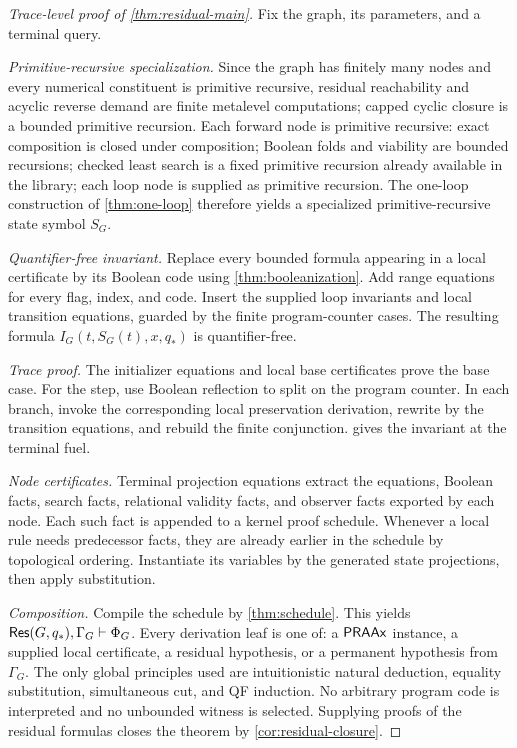 \begin{proof}[Trace-level proof of \cref{thm:residual-main}]
Fix the graph, its parameters, and a terminal query.

\emph{Primitive-recursive specialization.}  Since the graph has finitely many nodes and every numerical constituent is primitive recursive, residual reachability and acyclic reverse demand are finite metalevel computations; capped cyclic closure is a bounded primitive recursion.  Each forward node is primitive recursive: exact composition is closed under composition; Boolean folds and viability are bounded recursions; checked least search is a fixed primitive recursion already available in the library; each loop node is supplied as primitive recursion.  The one-loop construction of \cref{thm:one-loop} therefore yields a specialized primitive-recursive state symbol \(S_G\).

\emph{Quantifier-free invariant.}  Replace every bounded formula appearing in a local certificate by its Boolean code using \cref{thm:booleanization}.  Add range equations for every flag, index, and code.  Insert the supplied loop invariants and local transition equations, guarded by the finite program-counter cases.  The resulting formula \(I_G(t,S_G(t),x,q_*)\) is quantifier-free.

\emph{Trace proof.}  The initializer equations and local base certificates prove the base case.  For the step, use Boolean reflection to split on the program counter.  In each branch, invoke the corresponding local preservation derivation, rewrite by the transition equations, and rebuild the finite conjunction.   gives the invariant at the terminal fuel.

\emph{Node certificates.}  Terminal projection equations extract the equations, Boolean facts, search facts, relational validity facts, and observer facts exported by each node.  Each such fact is appended to a kernel proof schedule.  Whenever a local rule needs predecessor facts, they are already earlier in the schedule by topological ordering.  Instantiate its variables by the generated state projections, then apply substitution.

\emph{Composition.}  Compile the schedule by \cref{thm:schedule}.  This yields \(\mathsf{Res}(G,q_*),\Gamma_G\vdash\Phi_G\).  Every derivation leaf is one of: a \(\mathsf{PRAAx}\) instance, a supplied local certificate, a residual hypothesis, or a permanent hypothesis from \(\Gamma_G\).  The only global principles used are intuitionistic natural deduction, equality substitution, simultaneous cut, and QF induction.  No arbitrary program code is interpreted and no unbounded witness is selected.  Supplying proofs of the residual formulas closes the theorem by \cref{cor:residual-closure}.
\end{proof}

